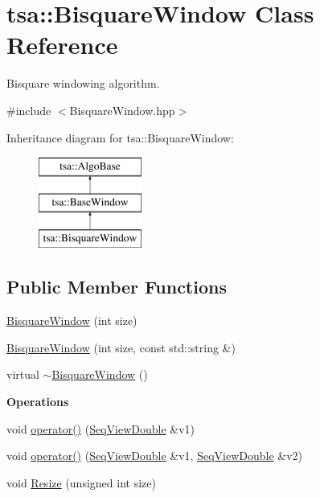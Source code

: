 \hypertarget{classtsa_1_1_bisquare_window}{}\section{tsa\+:\+:Bisquare\+Window Class Reference}
\label{classtsa_1_1_bisquare_window}


Bisquare windowing algorithm.  




{\ttfamily \#include $<$Bisquare\+Window.\+hpp$>$}

Inheritance diagram for tsa\+:\+:Bisquare\+Window\+:\begin{figure}[H]
\begin{center}
\leavevmode
\includegraphics[height=3.000000cm]{classtsa_1_1_bisquare_window}
\end{center}
\end{figure}
\subsection*{Public Member Functions}
\begin{DoxyCompactItemize}
\item 
\hyperlink{classtsa_1_1_bisquare_window_a6e5d4dbf8578ed2e9b516d9410c91156}{Bisquare\+Window} (int size)
\item 
\hyperlink{classtsa_1_1_bisquare_window_a3a76063272e48da547740c73de3c938e}{Bisquare\+Window} (int size, const std\+::string \&)
\item 
virtual \hyperlink{classtsa_1_1_bisquare_window_a050ef95c31279607ac93d854cbcf0670}{$\sim$\+Bisquare\+Window} ()
\end{DoxyCompactItemize}
\begin{Indent}\textbf{ Operations}\par
\begin{DoxyCompactItemize}
\item 
void \hyperlink{classtsa_1_1_bisquare_window_a8ad862435b17d306997adbb8be9c9b4f}{operator()} (\hyperlink{namespacetsa_ac599574bcc094eda25613724b8f3ca9e}{Seq\+View\+Double} \&v1)
\item 
void \hyperlink{classtsa_1_1_bisquare_window_a18002b225ed630af739a983da72a4006}{operator()} (\hyperlink{namespacetsa_ac599574bcc094eda25613724b8f3ca9e}{Seq\+View\+Double} \&v1, \hyperlink{namespacetsa_ac599574bcc094eda25613724b8f3ca9e}{Seq\+View\+Double} \&v2)
\item 
void \hyperlink{classtsa_1_1_bisquare_window_a0970518373e007e0fdd95701ff744c6f}{Resize} (unsigned int size)
\end{DoxyCompactItemize}
\end{Indent}
